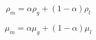 \begin{equation}
\label{eq:vof_dens}
\rho_m = \alpha \rho_g + (1 - \alpha) \rho_l
\end{equation}

\begin{equation}
\mu_m = \alpha \mu _g + (1 - \alpha) \mu _l
\end{equation}